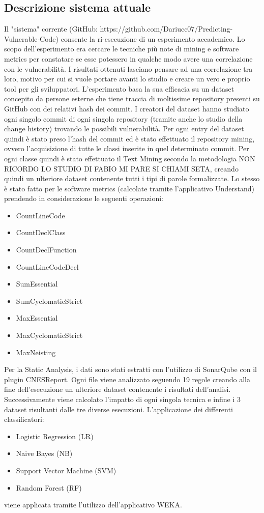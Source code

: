 \documentclass{article}
\begin{document}
\subsection{Descrizione sistema attuale}
Il "sistema" corrente (GitHub: https://github.com/Dariucc07/Predicting-Vulnerable-Code)
consente la ri-esecuzione di un esperimento accademico. Lo scopo dell'esperimento era cercare le tecniche più note di mining e software metrics per constatare se esse potessero in qualche modo avere una correlazione con le vulnerabilità. I risultati ottenuti lasciano pensare ad una correlazione tra loro, motivo per cui si vuole portare avanti lo studio e creare un vero e proprio tool per gli sviluppatori. 
L'esperimento basa la sua efficacia su un dataset concepito da persone esterne che tiene traccia di moltissime repository presenti su GitHub con dei relativi hash dei commit. I creatori del dataset hanno studiato ogni singolo commit di ogni singola repository (tramite anche lo studio della change history) trovando le possibili vulnerabilità. Per ogni entry del dataset quindi è stato preso l'hash del commit ed è stato effettuato il repository mining, ovvero l'acquisizione di tutte le classi inserite in quel determinato commit. Per ogni classe quindi è stato effettuato il Text Mining secondo la metodologia NON RICORDO LO STUDIO DI FABIO MI PARE SI CHIAMI SETA, creando quindi un ulteriore dataset contenente tutti i tipi di parole formalizzate. Lo stesso è stato fatto per le software metrics (calcolate tramite l'applicativo Understand) prendendo in considerazione le seguenti operazioni:
\begin{itemize}
    \item CountLineCode
    \item CountDeclClass
    \item CountDeclFunction
    \item CountLineCodeDecl
    \item SumEssential
    \item SumCyclomaticStrict
    \item MaxEssential
    \item MaxCyclomaticStrict
    \item MaxNeisting
\end{itemize}
Per la Static Analysis, i dati sono stati estratti con l'utilizzo di SonarQube con il plugin CNESReport.
Ogni file viene analizzato seguendo 19 regole creando alla fine dell'esecuzione un ulteriore dataset contenente i risultati dell'analisi. 
\\
Successivamente viene calcolato l'impatto di ogni singola tecnica e infine i 3 dataset risultanti dalle tre diverse esecuzioni. L'applicazione dei differenti classificatori:
\begin{itemize}
    \item Logistic Regression (LR)
    \item Naive Bayes (NB)
    \item Support Vector Machine (SVM)
    \item Random Forest (RF)
\end{itemize}
viene applicata tramite l'utilizzo dell'applicativo WEKA.
\end{document}
